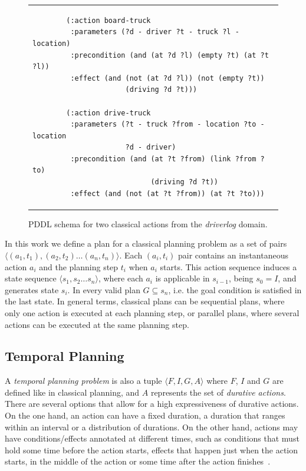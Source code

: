 \documentclass[10pt,journal,compsoc]{IEEEtran}
\newcommand{\tup}[1]{{\langle #1 \rangle}}
\begin{document}
\begin{figure}
	{\scriptsize
	\begin{tabular}{p{\textwidth}}
		\begin{verbatim}
		(:action board-truck
		 :parameters (?d - driver ?t - truck ?l - location)
		 :precondition (and (at ?d ?l) (empty ?t) (at ?t ?l))
		 :effect (and (not (at ?d ?l)) (not (empty ?t)) 
		              (driving ?d ?t)))
		
		(:action drive-truck
		 :parameters (?t - truck ?from - location ?to - location 
		              ?d - driver)
		 :precondition (and (at ?t ?from) (link ?from ?to) 
		                    (driving ?d ?t))
		 :effect (and (not (at ?t ?from)) (at ?t ?to)))
		\end{verbatim}
	\end{tabular}
	}
	\caption{\small PDDL schema for two classical actions from the {\em driverlog} domain.}
	\label{fig:exampleactions1}
\end{figure}


In this work we define a plan for a classical planning problem as a set of pairs $\tup{(a_1,t_1),(a_2,t_2)\ldots (a_n,t_n)}$. Each $(a_i,t_i)$ pair contains an instantaneous action $a_i$ and the planning step $t_i$ when $a_i$ starts.
This action sequence induces a state sequence $\tup{s_1,s_2\ldots s_n}$, where each $a_i$ is applicable in $s_{i-1}$, being $s_0=I$, and generates state $s_i$. In every valid plan $G\subseteq s_n$, i.e. the goal condition is satisfied in the last state.
In general terms, classical plans can be sequential plans, where only one action is executed at each planning step, or parallel plans, where several actions can be executed at the same planning step.




\subsection{Temporal Planning}
\label{sec:temporalplanning}

A {\em temporal planning problem} is also a tuple $\tup{F,I,G,A}$ where $F$, $I$ and $G$ are defined like in classical planning, and $A$ represents the set of {\em durative actions}. There are several options that allow for a high expressiveness of durative actions. On the one hand, an action can have a fixed duration, a duration that ranges within an interval or a distribution of durations. On the other hand, actions may have conditions/effects annotated at different times, such as conditions that must hold some time before the action starts, effects that happen just when the action starts, in the middle of the action or some time after the action finishes~\cite{garrido2009constraint}.
\end{document}
